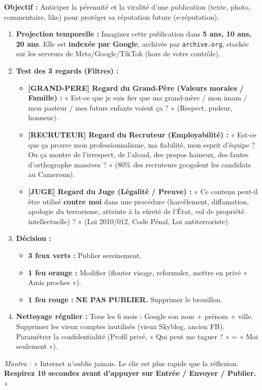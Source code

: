 \documentclass[11pt]{article}
\begin{document}
\begin{methode}
\textbf{Objectif :} Anticiper la pérennité et la viralité d'une publication (texte, photo, commentaire, like) pour protéger sa réputation future (e-réputation).
\begin{enumerate}
    \item \textbf{Projection temporelle :} Imaginez cette publication dans \textbf{5 ans, 10 ans, 20 ans}. Elle est \textbf{indexée par Google}, archivée par \texttt{archive.org}, stockée sur les serveurs de Meta/Google/TikTok (hors de votre contrôle).
    \item \textbf{Test des 3 regards (Filtres) :}
    \begin{itemize}
        \item \textbf{[GRAND-PERE] Regard du Grand-Père (Valeurs morales / Famille) :} « Est-ce que je suis fier que ma grand-mère / mon imam / mon pasteur / mes futurs enfants voient ça ? » (Respect, pudeur, honneur).
        \item \textbf{[RECRUTEUR] Regard du Recruteur (Employabilité) :} « Est-ce que ça prouve mon professionnalisme, ma fiabilité, mon esprit d'équipe ? Ou ça montre de l'irrespect, de l'alcool, des propos haineux, des fautes d'orthographe massives ? » (80\% des recruteurs googolent les candidats au Cameroun).
        \item \textbf{[JUGE] Regard du Juge (Légalité / Preuve) :} « Ce contenu peut-il être utilisé \textbf{contre moi} dans une procédure (harcèlement, diffamation, apologie du terrorisme, atteinte à la sûreté de l'État, vol de propriété intellectuelle) ? » (Loi 2010/012, Code Pénal, Loi antiterroriste).
    \end{itemize}
    \item \textbf{Décision :}
    \begin{itemize}
        \item \textbf{3 feux verts :} Publier sereinement.
        \item \textbf{1 feu orange :} Modifier (flouter visage, reformuler, mettre en privé « Amis proches »).
        \item \textbf{1 feu rouge :} \textbf{NE PAS PUBLIER.} Supprimer le brouillon.
    \end{itemize}
    \item \textbf{Nettoyage régulier :} Tous les 6 mois : Google son nom + prénom + ville. Supprimer les vieux comptes inutilisés (vieux Skyblog, ancien FB). Paramétrer la confidentialité (Profil privé, « Qui peut me taguer ? » = « Moi seulement »).
\end{enumerate}
\emph{Mantra :} « Internet n'oublie jamais. Le clic est plus rapide que la réflexion. \textbf{Respirez 10 secondes avant d'appuyer sur Entrée / Envoyer / Publier.} »
\end{methode}
\end{document}
